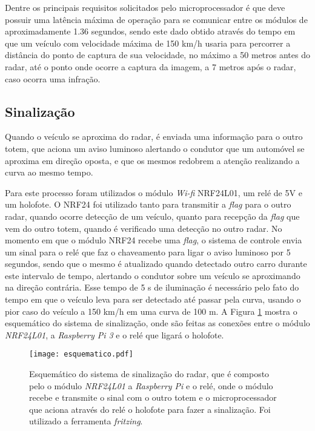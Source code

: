 Dentre os principais requisitos solicitados pelo microprocessador é que deve possuir uma latência máxima de operação para se comunicar entre os módulos de aproximadamente 1.36 segundos, sendo este dado obtido através do tempo em que um veículo com velocidade máxima de 150 km/h usaria para percorrer a distância do ponto de captura de sua velocidade, no máximo a 50 metros antes do radar, até o ponto onde ocorre a captura da imagem, a 7 metros após o radar, caso ocorra uma infração. 
      
\subsection{Sinalização}
    
Quando o veículo se aproxima do radar, é enviada uma informação para o outro totem, que aciona um aviso luminoso alertando o condutor que um automóvel se aproxima em direção oposta, e que os mesmos redobrem a atenção realizando a curva ao mesmo tempo. 

Para este processo foram utilizados o módulo \emph{Wi-fi} NRF24L01, um relé de 5V e um holofote. O NRF24 foi utilizado tanto para transmitir a \emph{flag} para o outro radar, quando ocorre detecção de um veículo, quanto para recepção da \emph{flag} que vem do outro totem, quando é verificado uma detecção no outro radar. No momento em que o módulo NRF24 recebe uma \emph {flag}, o sistema de controle envia um sinal para o relé que faz o chaveamento para ligar o aviso luminoso por 5 segundos, sendo que o mesmo é atualizado quando detectado outro carro durante este intervalo de tempo, alertando o condutor sobre um veículo se aproximando na direção contrária. Esse tempo de 5 s de iluminação é necessário pelo fato do tempo em que o veículo leva para ser detectado até passar pela curva, usando o pior caso do veículo a 150 km/h em uma curva de 100 m.
A Figura \ref{esquematico} mostra o esquemático do sistema de sinalização, onde são feitas as conexões entre o módulo \emph{NRF24L01}, a \emph{Raspberry Pi 3} e o relé que ligará o holofote.

\begin{figure}[H]
    \centering
    \texttt{[image: esquematico.pdf]}
    \caption{Esquemático do sistema de sinalização do radar, que é composto pelo o módulo \emph{NRF24L01} a \emph{Raspberry Pi} e o relé, onde o módulo recebe e transmite o sinal com o outro totem e o microprocessador que aciona através do relé o holofote para fazer a sinalização. Foi utilizado a ferramenta \emph{fritzing}.}
    \label{esquematico}
\end{figure}
   
